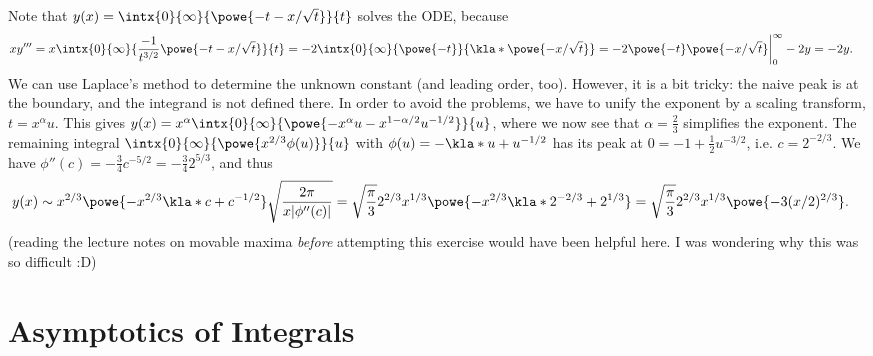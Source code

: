 \documentclass[english, parskip=full]{scrartcl}
\begin{document}
Note that $y(x) = \intx{0}{\infty}{\powe{-t - x/\sqrt{t}}}{t}$ solves the ODE, because
\begin{align}
xy''' &= x\intx{0}{\infty}{\frac{-1}{t^{3/2}} \powe{-t - x/\sqrt{t}}}{t} = -2\intx{0}{\infty}{\powe{-t} }{\kla*{\powe{- x/\sqrt{t}}}} = -2\powe{-t} \powe{-x/\sqrt{t}} \bigg\vert_0^\infty - 2y = -2y.
\end{align}
We can use Laplace's method to determine the unknown constant (and leading order, too).
However, it is a bit tricky: the naive peak is at the boundary, and the integrand is not defined there.
In order to avoid the problems, we have to unify the exponent by a scaling transform, $t=x^\alpha u$.
This gives $y(x) = x^\alpha \intx{0}{\infty}{\powe{-x^\alpha u - x^{1-\alpha/2} u^{-1/2}}}{u}$, where we now see that $\alpha = \frac{2}{3}$ simplifies the exponent.
The remaining integral $\intx{0}{\infty}{\powe{x^{2/3} \phi(u)}}{u}$ with $\phi(u) = -\kla*{u + u^{-1/2}}$ has its peak at $0=-1+\frac{1}{2}u^{-3/2}$, i.e. $c=2^{-2/3}$.
We have $\phi''(c) = -\frac{3}{4} c^{-5/2} = -\frac{3}{4} 2^{5/3}$, and thus
\begin{align}
y(x) &\sim x^{2/3} \powe{-x^{2/3} \kla*{c + c^{-1/2}}} \sqrt{\frac{2\pi}{x |\phi''(c)|}} = \sqrt{\frac{\pi}{3}} 2^{2/3} x^{1/3} \powe{-x^{2/3} \kla*{2^{-2/3} + 2^{1/3}}} = \sqrt{\frac{\pi}{3}} 2^{2/3} x^{1/3} \powe{-3(x/2)^{2/3}}.
\end{align}
(reading the lecture notes on movable maxima \emph{before} attempting this exercise would have been helpful here. I was wondering why this was so difficult :D)
\section{Asymptotics of Integrals}
\end{document}
